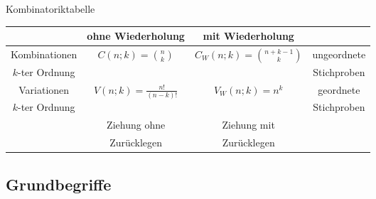 \begin{bonus}{Kombinatoriktabelle}
    \begin{center}
        \begin{tabular}{c|c|c|c}
            \cline{2-3}
                                                  & ohne Wiederholung                                            & mit Wiederholung                                              &                                  \\
            \hline
            \multicolumn{1}{|c|}{Kombinationen}   & \multirow{2}{*}{$\displaystyle C(n;k) = \binom{n}{k} $}      & \multirow{2}{*}{$\displaystyle C_W(n;k) = \binom{n+k-1}{k} $} & \multicolumn{1}{c|}{ungeordnete} \\
            \multicolumn{1}{|c|}{$k$-ter Ordnung} &                                                              &                                                               & \multicolumn{1}{c|}{Stichproben} \\
            \hline
            \multicolumn{1}{|c|}{Variationen}     & \multirow{2}{*}{$\displaystyle V(n;k) = \frac{n!}{(n-k)!} $} & \multirow{2}{*}{$\displaystyle V_W(n;k) = n^k $}              & \multicolumn{1}{c|}{geordnete}   \\
            \multicolumn{1}{|c|}{$k$-ter Ordnung} &                                                              &                                                               & \multicolumn{1}{c|}{Stichproben} \\
            \hline
                                                  & Ziehung ohne                                                 & Ziehung mit                                                   &                                  \\
                                                  & Zurücklegen                                                  & Zurücklegen                                                   &                                  \\
            \cline{2-3}
        \end{tabular}
    \end{center}
\end{bonus}

\subsection{Grundbegriffe}

